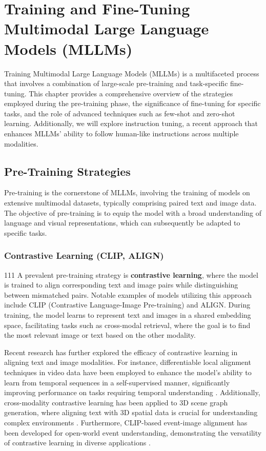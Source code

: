 \chapter{Training and Fine-Tuning Multimodal Large Language Models (MLLMs)}

Training Multimodal Large Language Models (MLLMs) is a multifaceted process that involves a combination of large-scale pre-training and task-specific fine-tuning. This chapter provides a comprehensive overview of the strategies employed during the pre-training phase, the significance of fine-tuning for specific tasks, and the role of advanced techniques such as few-shot and zero-shot learning. Additionally, we will explore instruction tuning, a recent approach that enhances MLLMs' ability to follow human-like instructions across multiple modalities.

\section{Pre-Training Strategies}

Pre-training is the cornerstone of MLLMs, involving the training of models on extensive multimodal datasets, typically comprising paired text and image data. The objective of pre-training is to equip the model with a broad understanding of language and visual representations, which can subsequently be adapted to specific tasks.

\subsection{Contrastive Learning (CLIP, ALIGN)}
111
A prevalent pre-training strategy is \textbf{contrastive learning}, where the model is trained to align corresponding text and image pairs while distinguishing between mismatched pairs. Notable examples of models utilizing this approach include CLIP (Contrastive Language-Image Pre-training) and ALIGN. During training, the model learns to represent text and images in a shared embedding space, facilitating tasks such as cross-modal retrieval, where the goal is to find the most relevant image or text based on the other modality.

Recent research has further explored the efficacy of contrastive learning in aligning text and image modalities. For instance, differentiable local alignment techniques in video data have been employed to enhance the model's ability to learn from temporal sequences in a self-supervised manner, significantly improving performance on tasks requiring temporal understanding \cite{temporal_alignment_2024}. Additionally, cross-modality contrastive learning has been applied to 3D scene graph generation, where aligning text with 3D spatial data is crucial for understanding complex environments \cite{3d_scene_graph_2024}. Furthermore, CLIP-based event-image alignment has been developed for open-world event understanding, demonstrating the versatility of contrastive learning in diverse applications \cite{event_image_alignment_2024}.


